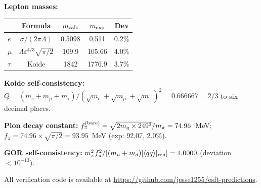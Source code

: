 ﻿\documentclass[twocolumn,preprintnumbers,amsmath,amssymb,prd]{revtex4-2}
\begin{document}
\textbf{Lepton masses:}
\begin{center}
\begin{tabular}{lcccc}
& Formula & $m_{\rm calc}$ & $m_{\rm exp}$ & Dev \\ \hline
$e$ & $\sigma/(2\pi\Lambda)$ & 0.5098 & 0.511 & 0.2\% \\
$\mu$ & $\Lambda\varepsilon^{4/3}\sqrt{\pi/2}$ & 109.9 & 105.66 & 4.0\% \\
$\tau$ & Koide & 1842 & 1776.9 & 3.7\% \\
\end{tabular}
\end{center}

\textbf{Koide self-consistency:} $Q = (m_e + m_\mu + m_\tau)/(\sqrt{m_e} + \sqrt{m_\mu} + \sqrt{m_\tau})^2 = 0.666667 = 2/3$ to six decimal places.

\textbf{Pion decay constant:}
$f_\pi^{(\rm bare)} = \sqrt{2m_q \times 249^3}/m_\pi = 74.96$~MeV; $f_\pi = 74.96 \times \sqrt{\pi/2} = 93.95$~MeV (exp: 92.07, 2.0\%).

\textbf{GOR self-consistency:} $m_\pi^2 f_\pi^2 / [(m_u+m_d)|\langle\bar{q}q\rangle|_{\rm ren}] = 1.0000$ (deviation $< 10^{-13}$).

All verification code is available at \url{https://github.com/jesse1255/esft-predictions}.
\end{document}

